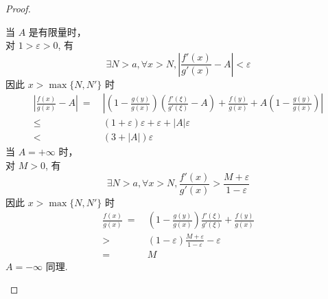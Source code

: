 \documentclass{article}
\begin{document}
\begin{proof}
\begin{itemize}
        当 $A$ 是有限量时， \\
        对 $1 > \varepsilon > 0$, 有 $$\exists N > a, \forall x > N, \left\lvert \frac{f'(x)}{g'(x)} - A\right\rvert < \varepsilon $$
        因此 $x > \max\{N, N'\}$ 时
        \begin{align*}
            \left\lvert \frac{f(x)}{g(x)} - A\right\rvert\ =\ & \left\lvert \left(1 - \frac{g(y)}{g(x)}\right)\left(\frac{f'(\xi)}{g'(\xi)} - A\right) + \frac{f(y)}{g(x)} + A\left(1 - \frac{g(y)}{g(x)}\right)\right\rvert \\
            \leqslant\ & (1 + \varepsilon) \varepsilon + \varepsilon + \left\lvert A\right\rvert  \varepsilon \\
            <\ & (3 + \left\lvert A\right\rvert )\varepsilon
        \end{align*}
        当 $A = +\infty$ 时， \\
        对 $M > 0$, 有 $$\exists N > a, \forall x > N, \frac{f'(x)}{g'(x)} > \frac{M + \varepsilon}{1 - \varepsilon}$$
        因此 $x > \max\{N, N'\}$ 时
        \begin{align*}
            \frac{f(x)}{g(x)}\ =\ & \left(1 - \frac{g(y)}{g(x)}\right)\frac{f'(\xi)}{g'(\xi)} + \frac{f(y)}{g(x)} \\
            >\ & (1 - \varepsilon)\frac{M + \varepsilon}{1 - \varepsilon} - \varepsilon \\
            =\ & M
        \end{align*}
        $A = -\infty$ 同理.
    \end{itemize}
\end{proof}
\end{document}
